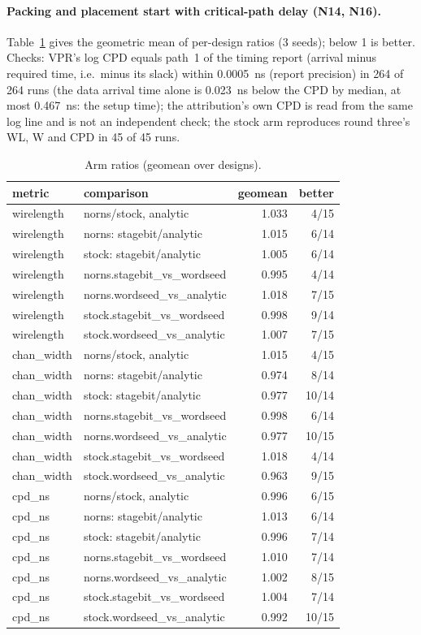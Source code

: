 \paragraph{Packing and placement start with critical-path delay (N14, N16).} Table~\ref{tab:r4arms} gives the geometric mean of per-design ratios (3 seeds); below 1 is better.
Checks: VPR's log CPD equals path~1 of the timing report (arrival minus required time, i.e.\ minus its slack) within 0.0005~ns (report precision) in 264 of 264 runs (the data arrival time alone is 0.023~ns below the CPD by median, at most 0.467~ns: the setup time); the attribution's own CPD is read from the same log line and is not an independent check; the stock arm reproduces round three's WL, W and CPD in 45 of 45 runs.
\begin{table}[t]
\caption{Arm ratios (geomean over designs).}
\label{tab:r4arms}
\centering\scriptsize\setlength{\tabcolsep}{2pt}
\begin{tabular}{@{}llrr@{}}
\toprule
metric & comparison & geomean & better \\
\midrule
wirelength & norns/stock, analytic & 1.033 & 4/15 \\
wirelength & norns: stagebit/analytic & 1.015 & 6/14 \\
wirelength & stock: stagebit/analytic & 1.005 & 6/14 \\
wirelength & norns.stagebit\_vs\_wordseed & 0.995 & 4/14 \\
wirelength & norns.wordseed\_vs\_analytic & 1.018 & 7/15 \\
wirelength & stock.stagebit\_vs\_wordseed & 0.998 & 9/14 \\
wirelength & stock.wordseed\_vs\_analytic & 1.007 & 7/15 \\
chan\_width & norns/stock, analytic & 1.015 & 4/15 \\
chan\_width & norns: stagebit/analytic & 0.974 & 8/14 \\
chan\_width & stock: stagebit/analytic & 0.977 & 10/14 \\
chan\_width & norns.stagebit\_vs\_wordseed & 0.998 & 6/14 \\
chan\_width & norns.wordseed\_vs\_analytic & 0.977 & 10/15 \\
chan\_width & stock.stagebit\_vs\_wordseed & 1.018 & 4/14 \\
chan\_width & stock.wordseed\_vs\_analytic & 0.963 & 9/15 \\
cpd\_ns & norns/stock, analytic & 0.996 & 6/15 \\
cpd\_ns & norns: stagebit/analytic & 1.013 & 6/14 \\
cpd\_ns & stock: stagebit/analytic & 0.996 & 7/14 \\
cpd\_ns & norns.stagebit\_vs\_wordseed & 1.010 & 7/14 \\
cpd\_ns & norns.wordseed\_vs\_analytic & 1.002 & 8/15 \\
cpd\_ns & stock.stagebit\_vs\_wordseed & 1.004 & 7/14 \\
cpd\_ns & stock.wordseed\_vs\_analytic & 0.992 & 10/15 \\
\bottomrule
\end{tabular}
\end{table}
